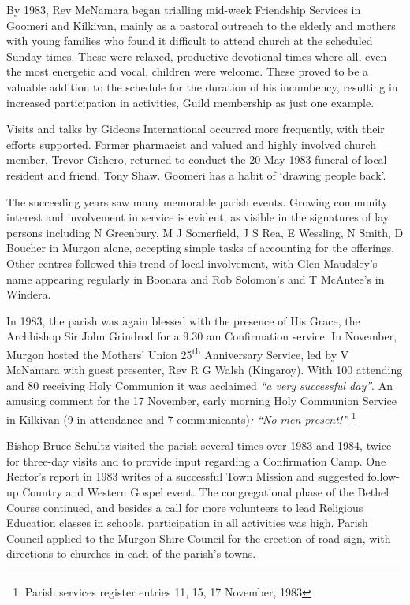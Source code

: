 By 1983, Rev McNamara began trialling mid-week Friendship Services in Goomeri and Kilkivan, mainly as a pastoral outreach to the elderly and mothers with young families who found it difficult to attend church at the scheduled Sunday times. These were relaxed, productive devotional times where all, even the most energetic and vocal, children were welcome. These proved to be a valuable addition to the schedule for the duration of his incumbency, resulting in increased participation in activities, Guild membership as just one example.



Visits and talks by Gideons International occurred more frequently, with their efforts supported. Former pharmacist and valued and highly involved church member, Trevor Cichero, returned to conduct the 20 May 1983 funeral of local resident and friend, Tony Shaw. Goomeri has a habit of `drawing people back'.



The succeeding years saw many memorable parish events. Growing community interest and involvement in service is evident, as visible in the signatures of lay persons including N Greenbury, M J Somerfield, J S Rea, E Wessling, N Smith, D Boucher in Murgon alone, accepting simple tasks of accounting for the offerings. Other centres followed this trend of local involvement, with Glen Maudsley's name appearing regularly in Boonara and Rob Solomon's and T McAntee's in Windera.



In 1983, the parish was again blessed with the presence of His Grace, the Archbishop Sir John Grindrod for a 9.30 am Confirmation service. In November, Murgon hosted the Mothers' Union 25\textsuperscript{th} Anniversary Service, led by V McNamara with guest presenter, Rev R G Walsh (Kingaroy). With 100 attending and 80 receiving Holy Communion it was acclaimed \emph{``a very successful day''}. An amusing comment for the 17 November, early morning Holy Communion Service in Kilkivan (9 in attendance and 7 communicants)\emph{: ``No men present!''} \footnote{Parish services register entries 11, 15, 17 November, 1983}


Bishop Bruce Schultz visited the parish several times over 1983 and 1984, twice for three-day visits and to provide input regarding a Confirmation Camp. One Rector's report in 1983 writes of a successful Town Mission and suggested follow-up Country and Western Gospel event. The congregational phase of the Bethel Course continued, and besides a call for more volunteers to lead Religious Education classes in schools, participation in all activities was high. Parish Council applied to the Murgon Shire Council for the erection of road sign, with directions to churches in each of the parish's towns.



